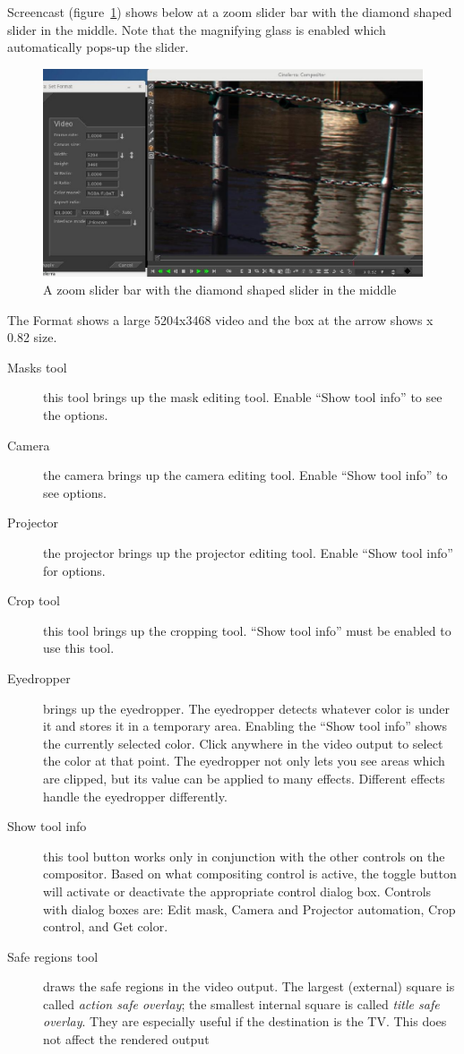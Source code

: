 Screencast (figure~\ref{fig:zoom_slider}) shows below at a zoom slider bar with the diamond shaped slider in the middle.  Note 
that the magnifying glass is  enabled which automatically pops-up the slider.

\begin{figure}[htpb]
    \centering
    \includegraphics[width=0.99\linewidth]{images/zoom_slider.png}
    \caption{A zoom slider bar with the diamond shaped slider in the middle}
    \label{fig:zoom_slider}
\end{figure}
The Format shows a large 5204x3468 video and the box at the arrow shows x 0.82 size.  

\begin{description}
    \item[Masks tool] this tool brings up the mask editing tool. Enable “Show tool info” to see the options.
    \item[Camera]  the camera brings up the camera editing tool. Enable “Show tool info” to see options.
    \item[Projector]  the projector brings up the projector editing tool. Enable “Show tool info” for options.
    \item[Crop tool]  this tool brings up the cropping tool. “Show tool info” must be enabled to use this tool.
    \item[Eyedropper]  brings up the eyedropper. The eyedropper detects whatever color is under it and stores it
        in a temporary area. Enabling the “Show tool info” shows the currently selected color. Click
        anywhere in the video output to select the color at that point. The eyedropper not only lets you see
        areas which are clipped, but its value can be applied to many effects. Different effects handle the
        eyedropper differently.
    \item[Show tool info]  this tool button works only in conjunction with the other controls on the compositor.
        Based on what compositing control is active, the toggle button will activate or deactivate the
        appropriate control dialog box. Controls with dialog boxes are: Edit mask, Camera and Projector
        automation, Crop control, and Get color.
    \item[Safe regions tool]  draws the safe regions in the video output. The largest (external) square is called \textit{action safe overlay}; the smallest internal square is called \textit{title safe overlay}. They are especially useful if the destination is the TV. This does not affect the rendered output
\end{description}

